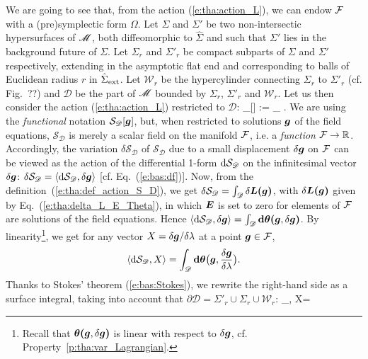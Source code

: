 We are going to see that, from the action (\ref{e:tha:action_L}),
we can endow $\mathcal{F}$ with a (pre)symplectic form $\Omega$.
Let
$\Sigma$ and $\Sigma'$ be two non-intersectic hypersurfaces of $\mathscr{M}$,
both diffeomorphic to $\hat{\Sigma}$ and such that $\Sigma'$ lies in the
background future of $\Sigma$. Let $\Sigma_r$ and $\Sigma'_r$
be compact subparts
of $\Sigma$ and $\Sigma'$ respectively,
extending in the asymptotic flat end and corresponding to balls of Euclidean radius $r$
in $\hat{\Sigma}_{\rm ext}$. Let $\mathscr{W}_r$
be the hypercylinder
connecting $\Sigma_r$ to $\Sigma'_r$ (cf. Fig.~??)
and $\mathscr{D}$ be the part
of $\mathscr{M}$ bounded by $\Sigma_r$, $\Sigma'_r$ and $\mathscr{W}_r$. Let us then consider the
action (\ref{e:tha:action_L}) restricted to $\mathscr{D}$:
\be \label{e:tha:def_action_S_D}
    _{}[] := \int_{} \lld{}\rld .
\ee
We are using the \emph{functional} notation $\mathcal{S}_{\mathscr{D}}[\bm{g}]$,
but, when restricted to solutions $\bm{g}$ of the field equations,
$\mathcal{S}_{\mathscr{D}}$ is merely a scalar field on the manifold $\mathcal{F}$,
i.e. a \emph{function} $\mathcal{F}\to \mathbb{R}$.
Accordingly, the variation $\delta\mathcal{S}_{\mathscr{D}}$ of $\mathcal{S}_{\mathscr{D}}$
due to a small displacement $\delta\bm{g}$ on $\mathcal{F}$ can be viewed
as the action of the differential 1-form $\mathrm{d} \mathcal{S}_{\mathscr{D}}$
on the infinitesimal vector $\delta\bm{g}$:
$\delta\mathcal{S}_{\mathscr{D}} =
\langle \mathrm{d} \mathcal{S}_{\mathscr{D}},\delta\bm{g}\rangle$
[cf. Eq.~(\ref{e:bas:df})]. Now, from the definition~(\ref{e:tha:def_action_S_D}),
we get $\delta\mathcal{S}_{\mathscr{D}} = \int_{\mathscr{D}} \delta \bm{L}\textbf{(}\bm{g}\textbf{)}$,
with $\delta\bm{L}\textbf{(}\bm{g}\textbf{)}$ given by Eq.~(\ref{e:tha:delta_L_E_Theta}),
in which $\bm{E}$ is set to zero for elements of $\mathcal{F}$ are solutions of the field equations.
Hence
$\langle \mathrm{d} \mathcal{S}_{\mathscr{D}},\delta\bm{g}\rangle =
\int_{\mathscr{D}} \mathbf{d} \bm{\theta}\textbf{(}\bm{g},\delta\bm{g}\textbf{)}$.
By linearity\footnote{Recall that $\bm{\theta}\textbf{(}\bm{g},\delta\bm{g}\textbf{)}$ is linear
with respect to $\delta\bm{g}$, cf. Property~\ref{p:tha:var_Lagrangian}.}, we get for any vector $X = \delta\bm{g}/\delta\lambda$ at a point $\bm{g}\in\mathcal{F}$,
\[
    \langle \mathrm{d} \mathcal{S}_{\mathscr{D}}, X\rangle =
\int_{\mathscr{D}} \mathbf{d} \bm{\theta}\bm{\big(}\bm{g},\frac{\delta\bm{g}}{\delta\lambda}\bm{\big)} .
\]
Thanks to Stokes' theorem (\ref{e:bas:Stokes}),
we rewrite the right-hand side as a surface integral, taking into
account that $\partial\mathscr{D} = \Sigma'_r \cup \Sigma_r \cup \mathscr{W}_r$:
\be \label{e:tha:dS_D_3int}
 \langle \Dd {}_{}, X\rangle =
